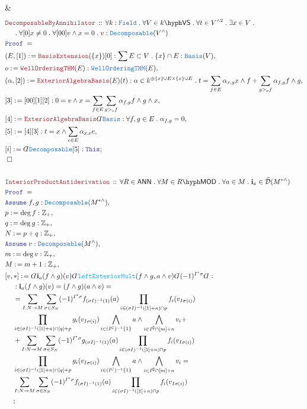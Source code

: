 \documentclass[12pt]{scrartcl}%
\newcommand{\TYPE}[1]{\textcolor{NavyBlue}{\mathtt{#1}}}%
\newcommand{\FUNC}[1]{\textcolor{Cerulean}{\mathtt{#1}}}%
\newcommand{\LOGIC}[1]{\textcolor{Blue}{\mathtt{#1}}}%
\newcommand{\THM}[1]{\textcolor{Maroon}{\mathtt{#1}}}%
\renewcommand{\.}{\; . \;} %
\newcommand{\de}{: \kern 0.1pc =} %
\newcommand{\Theorem}[2]{& \THM{#1} \, :: \, #2 \\ & \Proof = \\ } %
\newcommand{\NewLine}{\\ & \kern 1pc}%
\newcommand{\Page}[1]{ \begin{align*} #1 \end{align*}  }%
\newcommand{ \bd }{ \ByDef }%
\newcommand{\Int}{\mathbb{Z}}%
\renewcommand{\c}{\complement}%
\newcommand{\Say}[3]{& #1 \de #2 : #3, \\} %
\newcommand{\Conclude}[3]{& #1 \de #2 : #3; \\}%
\newcommand{\Assume}[2]{& \LOGIC{Assume} \; #1 : #2, \\} %
\newcommand{\QED}{\; \square} %
\newcommand{\EndProof}{& \QED \\} %
\newcommand{\ByDef}{\rotatebox[origin=c]{-180}{$D$}}%
\newcommand{\Proof}{\LOGIC{Proof} \; } %
\newcommand{\C}{\mathcal{C}}
\newcommand{\D}{\mathcal{D}}
\newcommand{\VS}[1]{#1\hyph\mathsf{VS}} %
\newcommand{\LMOD}[1]{#1\hyph\mathsf{MOD}} %
\newcommand{\Field}{\TYPE{Field}}
\newcommand{\ANN}{\mathsf{ANN}} %
\begin{document}
{	\EndProof
}\Page{
	\Theorem{DecomposableByAnnihilator}{
		\forall k : \Field \.
		\forall V \in \VS{k} \. 
		\forall t \in V^{\wedge2} \.
		\exists x \in V \. \NewLine \. 
		\forall [0] x \neq 0 \.
		\forall [00] v \wedge x = 0 \.
		v : \TYPE{Decomposable}(V^\wedge)
	}
	\Say{(E,[1])}{\THM{BasisExtension}(\{x\})[0]}
	{
		\sum E \subset V \.  \{x\} \cap E : \TYPE{Basis}(V) 
	}
	\Say{o}{\THM{WellOrderingTHM}(E)}{\TYPE{WellOrderingTHM}(E)}
	\Say{(\alpha,[2])}{\THM{ExteriorAlgebraBasis}(E)(t)} 
	{
		\alpha \in k^{\oplus \{x\} \cup E \times \{x\} \cup E} \. 
		t =  \sum_{f \in E} \alpha_{x,g} x \wedge f +  \sum_{g >_o f} \alpha_{f,g} f \wedge g
	}
	\Say{[3]}{[00][1][2]}{ 0  = v \wedge x = \sum_{f \in E} \sum_{g >_o f} \alpha_{f,g} f \wedge g \wedge x }
	\Say{[4]}{\THM{ExteriorAlgebraBasis}\bd \TYPE{Basis}}{ \forall f, g \in E \. \alpha_{f,g} = 0 }
	\Say{[5]}{[4][3]}{t = x \wedge \sum_{e \in E} \alpha_{x,e} e}
	\Conclude{[i]}{\bd \TYPE{Decomposable}[5]}{\LOGIC{This}}
	\EndProof
	\\
	\Theorem{InteriorProductAntiderivation}{
		\forall R \in \ANN \.
		\forall M \in \LMOD{R} \.
		\forall a \in M \. 
		\mathbf{i}_a \in \widetilde{\D}(M^{*\wedge})                                                         
	}
	\Assume{f,g}{\TYPE{Decomposable}(M^{*\wedge})}
	\Say{p}{\deg f}{\Int_+}
	\Say{q}{\deg g}{\Int_+}
	\Say{N}{p+q}{\Int_+}
	\Assume{v}{\TYPE{Decomposable}(M^\wedge)}
	\Say{m}{\deg v}{\Int_+}
	\Say{M}{m+1}{\Int_+}
	\Conclude{[v,*]}{\bd \mathbf{i}_a(f \wedge g)(v) \bd \FUNC{leftExteriorMult}(f \wedge g,a \wedge v) \bd (-1)^{I^*\sigma} \bd}
	{
		\NewLine :
		\mathbf{i}_a(f \wedge g)(v) = 
		(f \wedge g)(a \wedge v) = \NewLine =  
		\sum_{I : N \to M } 
		\sum_{\sigma \in S_N}  (-1)^{I^*\sigma} f_{(\sigma I)^{-1}(1)}(a)
		\prod_{i \in (\sigma I)^{-1}([1] + n) \cap p} f_{i}(v_{I\sigma(i)}) \NewLine 
		\prod_{i \in (\sigma I)^{-1}([1] + n) \cap [q] + p} g_{i}(v_{I\sigma(i)})                                   
		\bigwedge_{  i \in  (I^\C)^{-1}\{1\}  } a
		\wedge
		\bigwedge_{i \in I^\c \cap [m] + n} v_i  
		+ \NewLine + 
		\sum_{I : N \to M } 
		\sum_{\sigma \in S_N}  (-1)^{I^*\sigma} g_{(\sigma I)^{-1}(1)}(a) 
		\prod_{i \in (\sigma I)^{-1}([1] + n) \cap p} f_{i}(v_{I\sigma(i)}) \NewLine 
		\prod_{i \in (\sigma I)^{-1}([1] + n) \cap [q] + p} g_{i}(v_{I\sigma(i)})                                   
		\bigwedge_{ i \in  ( I^\C)^{-1}\{1\}  } a
		\wedge
		\bigwedge_{i \in I^\c \cap [m] + n} v_i = \NewLine
		\sum_{I : N \to M } 
		\sum_{\sigma \in S_N}  (-1)^{I^*\sigma} f_{(\sigma I)^{-1}(1)}(a)
		\prod_{i \in (\sigma I)^{-1}([1] + n) \cap p} f_{i}(v_{I\sigma(i)}) \NewLine 
}}
\end{document}
